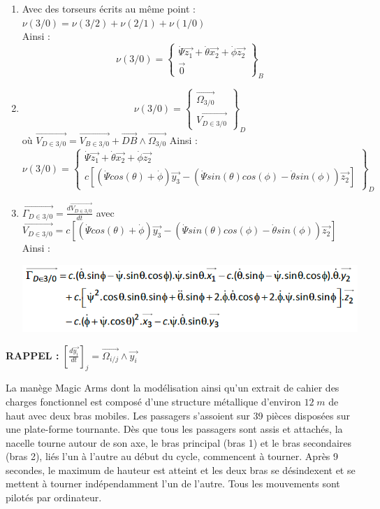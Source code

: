 {\begin{enumerate}
\item Avec des torseurs écrits au même point : $\nu(3/0)=\nu(3/2)+\nu(2/1)+\nu(1/0)$\\
Ainsi :
\[ \nu(3/0)=\left\{ \begin{array}{cc}
\dot{\Psi}\overrightarrow{z_1}+\dot{\theta}\overrightarrow{x_2}+\dot{\phi}\overrightarrow{z_2} \\ \overrightarrow{0} \end{array} \right\}_B \]
\item \[ \nu(3/0)=\left\{ \begin{array}{cc}
\overrightarrow{\Omega_{3/0}} \\ \overrightarrow{V_{D \in 3/0}} \end{array} \right\}_D \]
où \( \overrightarrow{V_{D \in 3/0}} = \overrightarrow{V_{B \in 3/0}}+\overrightarrow{DB}\wedge \overrightarrow{\Omega_{3/0}} \)
Ainsi :
\[ \nu(3/0)=\left\{ \begin{array}{cc}
\dot{\Psi}\overrightarrow{z_1}+\dot{\theta}\overrightarrow{x_2}+\dot{\phi}\overrightarrow{z_2} \\ c[(\dot{\Psi}cos(\theta)+\dot{\phi})\overrightarrow{y_3}-(\dot{\Psi}sin(\theta)cos(\phi)-\dot{\theta}sin(\phi))\overrightarrow{z_2}] \end{array} \right\}_D \]
\item \( \overrightarrow{\Gamma_{D \in 3/0}} = \frac{d \overrightarrow{V_{D \in 3/0}}}{dt}\) avec \( \overrightarrow{V_{D \in 3/0}} = c[(\dot{\Psi}cos(\theta)+\dot{\phi})\overrightarrow{y_3}-(\dot{\Psi}sin(\theta)cos(\phi)-\dot{\theta}sin(\phi))\overrightarrow{z_2}] \)
Ainsi :
\begin{center}
\includegraphics[scale=0.4]{png/acceleration_manege.png}
\end{center}
\end{enumerate}

\textbf{RAPPEL :} \( [\frac{d\overrightarrow{y_i}}{dt}]_j = \overrightarrow{\Omega_{i/j}} \wedge \overrightarrow{y_i} \)
}
\newpage

La manège Magic Arms dont la modélisation ainsi qu'un extrait de cahier des charges fonctionnel est composé d'une structure métallique d'environ $12\; m$ de haut avec deux bras mobiles. Les passagers s'assoient sur 39 pièces disposées sur une plate-forme tournante. Dès que tous les passagers sont assis et attachés, la nacelle tourne autour de son axe, le bras principal (bras 1) et le bras secondaires (bras 2), liés l'un à l'autre au début du cycle, commencent à tourner. Après 9 secondes, le maximum de hauteur est atteint et les deux bras se désindexent et se mettent à tourner indépendamment l'un de l'autre. Tous les mouvements sont pilotés par ordinateur. 

